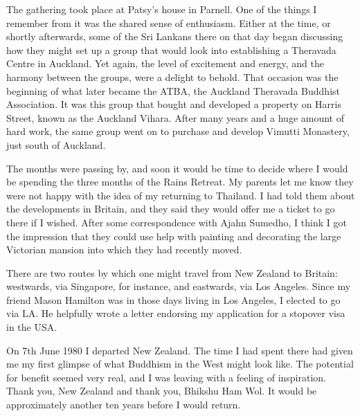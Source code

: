 The gathering took place at Patsy's house in Parnell. One of the things
I remember from it was the shared sense of enthusiasm. Either at the
time, or shortly afterwards, some of the Sri Lankans there on that day
began discussing how they might set up a group that would look into
establishing a Theravada Centre in Auckland. Yet again, the level of
excitement and energy, and the harmony between the groups, were a
delight to behold. That occasion was the beginning of what later became
the ATBA, the Auckland Theravada Buddhist Association. It was this group
that bought and developed a property on Harris Street, known as the
Auckland Vihara\cite{auckland}. After many years and a huge amount of hard work, the
same group went on to purchase and develop Vimutti Monastery\cite{vimutti},
just south of Auckland.

The months were passing by, and soon it would be time to decide where I
would be spending the three months of the Rains Retreat. My parents let
me know they were not happy with the idea of my returning to Thailand. I
had told them about the developments in Britain, and they said they
would offer me a ticket to go there if I wished. After some
correspondence with Ajahn Sumedho, I think I got the impression that
they could use help with painting and decorating the large Victorian
mansion into which they had recently moved.

There are two routes by which one might travel from New Zealand to
Britain: westwards, via Singapore, for instance, and eastwards, via Los
Angeles. Since my friend Mason Hamilton was in those days living in Los
Angeles, I elected to go via LA. He helpfully wrote a letter endorsing
my application for a stopover visa in the USA.

On 7th June 1980 I departed New Zealand. The time I had spent there had
given me my first glimpse of what Buddhism in the West might look like.
The potential for benefit seemed very real, and I was leaving with a
feeling of inspiration. Thank you, New Zealand and thank you, Bhikshu
Ham Wol. It would be approximately another ten years before I would
return.


